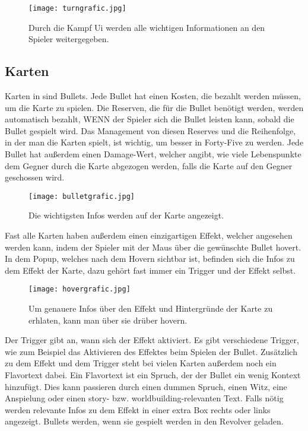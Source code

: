 \begin{figure}[H]
    \texttt{[image: turngrafic.jpg]}
    \caption{Durch die Kampf Ui werden alle wichtigen Informationen an den Spieler weitergegeben.}
\end{figure}



\subsection{Karten}\label{Karten}
Karten in \FF sind Bullets. Jede Bullet hat einen Kosten, die bezahlt werden müssen, um die Karte zu spielen.
Die Reserven, die für die Bullet benötigt werden, werden automatisch bezahlt, WENN der Spieler sich die Bullet leisten kann, sobald die Bullet gespielt wird.
Das Management von diesen Reserves und die Reihenfolge, in der man die Karten spielt, ist wichtig, um besser in Forty-Five zu werden.
Jede Bullet hat außerdem einen Damage-Wert, welcher angibt, wie viele Lebenspunkte dem Gegner durch die Karte abgezogen werden,
falls die Karte auf den Gegner geschossen wird.

\begin{figure}[H]
    \texttt{[image: bulletgrafic.jpg]}
    \caption{Die wichtigsten Infos werden auf der Karte angezeigt.}
\end{figure}

Fast alle Karten haben außerdem einen einzigartigen Effekt,
welcher angesehen werden kann, indem der Spieler mit der Maus über die gewünschte Bullet hovert.
In dem Popup, welches nach dem Hovern sichtbar ist, befinden sich die Infos zu dem Effekt der Karte,
dazu gehört fast immer ein Trigger und der Effekt selbst.

\begin{figure}[H]
    \texttt{[image: hovergrafic.jpg]}
    \caption{Um genauere Infos über den Effekt und Hintergründe der Karte zu erhlaten, kann man über sie drüber hovern.}
\end{figure}


Der Trigger gibt an, wann sich der Effekt aktiviert. Es gibt verschiedene Trigger, wie zum Beispiel das Aktivieren des Effektes beim Spielen der Bullet.
Zusätzlich zu dem Effekt und dem Trigger steht bei vielen Karten außerdem noch ein Flavortext dabei.
Ein Flavortext ist ein Spruch, der der Bullet ein wenig Kontext hinzufügt.
Dies kann passieren durch einen dummen Spruch, einen Witz, eine Anspielung oder einen story- bzw. worldbuilding-relevanten Text.
Falls nötig werden relevante Infos zu dem Effekt in einer extra Box rechts oder links angezeigt.
Bullets werden, wenn sie gespielt werden in den Revolver geladen.

